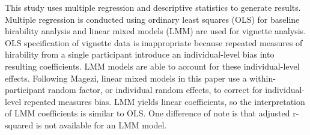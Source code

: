 This study uses multiple regression and descriptive statistics to generate results.
Multiple regression is conducted using ordinary least squares (OLS)
for baseline hirability analysis
and linear mixed models (LMM)
are used for vignette analysis.
OLS specification of vignette data is inappropriate because repeated measures of hirability
from a single participant introduce an individual-level bias into resulting coefficients.
LMM models are able to account for these individual-level effects.
Following Magezi\cite{magezi2015linear},
linear mixed models in this paper use a within-participant random factor,
or individual random effects,
to correct for individual-level repeated measures bias.
LMM yields linear coefficients, so the interpretation of LMM coefficients is similar to OLS.
One difference of note is that adjusted r-squared is not available for an LMM model.


